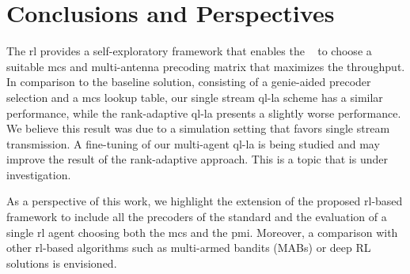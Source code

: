 \section{Conclusions and Perspectives}
\label{sec:la-conclusion}
The \gls{rl} provides a self-exploratory framework that enables the \base~ to choose a suitable \gls{mcs} and multi-antenna precoding matrix that maximizes the throughput.
%
%
In comparison to the baseline solution, consisting of a genie-aided precoder selection and a \gls{mcs} lookup table, our single stream \gls{ql-la} scheme has a similar performance, while the rank-adaptive \gls{ql-la} presents a slightly worse performance.
%
We believe this result was due to a simulation setting that favors single stream transmission.
%
A fine-tuning of our multi-agent \gls{ql-la} is being studied and may improve the result of the rank-adaptive approach.
%
This is a topic that is under investigation.

As a perspective of this work, we highlight the extension of the proposed \gls{rl}-based framework to include all the precoders of the standard \cite{3gpp.38.214} and the evaluation of a single \gls{rl} agent choosing both the \gls{mcs} and the \gls{pmi}.
%
Moreover, a comparison with other \gls{rl}-based algorithms such as multi-armed bandits (MABs) \cite{zhou2015survey} or deep RL solutions \cite{DeepRLSurvey} is envisioned.
%
